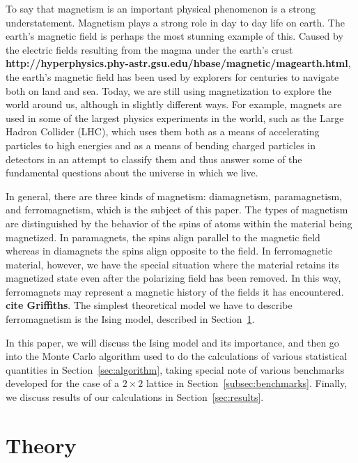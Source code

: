 \documentclass[12pt]{article}
\numberwithin{equation}{section}
\begin{document}
To say that magnetism is an important physical phenomenon is a strong understatement.  Magnetism plays a strong role in day to day life on earth.  The earth's magnetic field is perhaps the most stunning example of this.  Caused by the electric fields resulting from the magma under the earth's crust \textbf{http://hyperphysics.phy-astr.gsu.edu/hbase/magnetic/magearth.html}, the earth's magnetic field has been used by explorers for centuries to navigate both on land and sea.  Today, we are still using magnetization to explore the world around us, although in slightly different ways.  For example, magnets are used in some of the largest physics experiments in the world, such as the Large Hadron Collider (LHC), which uses them both as a means of accelerating particles to high energies and as a means of bending charged particles in detectors in an attempt to classify them and thus answer some of the fundamental questions about the universe in which we live.
\par In general, there are three kinds of magnetism: diamagnetism, paramagnetism, and ferromagnetism, which is the subject of this paper.  The types of magnetism are distinguished by the behavior of the spins of atoms within the material being magnetized.  In paramagnets, the spins align parallel to the magnetic field whereas in diamagnets the spins align opposite to the field.  In ferromagnetic material, however, we have the special situation where the material retains its magnetized state even after the polarizing field has been removed.  In this way, ferromagnets may represent a magnetic history of the fields it has encountered. \textbf{cite Griffiths}.  The simplest theoretical model we have to describe ferromagnetism is the Ising model, described in Section~\ref{sec:theory}.  
\par In this paper, we will discuss the Ising model and its importance, and then go into the Monte Carlo algorithm used to do the calculations of various statistical quantities in Section~\ref{sec:algorithm}, taking special note of various benchmarks developed for the case of a $2\times2$ lattice in Section~\ref{subsec:benchmarks}.  Finally, we discuss results of our calculations in Section~\ref{sec:results}.

\section{Theory}
\label{sec:theory}
\end{document}
